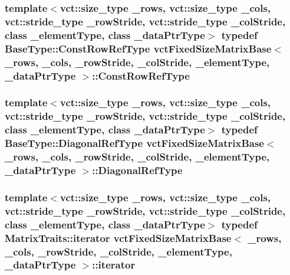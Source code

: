 \subsubsection[{Const\+Row\+Ref\+Type}]{\setlength{\rightskip}{0pt plus 5cm}template$<$vct\+::size\+\_\+type \+\_\+rows, vct\+::size\+\_\+type \+\_\+cols, vct\+::stride\+\_\+type \+\_\+row\+Stride, vct\+::stride\+\_\+type \+\_\+col\+Stride, class \+\_\+element\+Type, class \+\_\+data\+Ptr\+Type$>$ typedef {\bf Base\+Type\+::\+Const\+Row\+Ref\+Type} {\bf vct\+Fixed\+Size\+Matrix\+Base}$<$ \+\_\+rows, \+\_\+cols, \+\_\+row\+Stride, \+\_\+col\+Stride, \+\_\+element\+Type, \+\_\+data\+Ptr\+Type $>$\+::{\bf Const\+Row\+Ref\+Type}}\label{classvct_fixed_size_matrix_base_a506ec116d1e4c9c1b5d89f9f952e5b2d}
\hypertarget{classvct_fixed_size_matrix_base_af379c84a0eb55ebfac0c6bf715eb28e3}{}
\subsubsection[{Diagonal\+Ref\+Type}]{\setlength{\rightskip}{0pt plus 5cm}template$<$vct\+::size\+\_\+type \+\_\+rows, vct\+::size\+\_\+type \+\_\+cols, vct\+::stride\+\_\+type \+\_\+row\+Stride, vct\+::stride\+\_\+type \+\_\+col\+Stride, class \+\_\+element\+Type, class \+\_\+data\+Ptr\+Type$>$ typedef {\bf Base\+Type\+::\+Diagonal\+Ref\+Type} {\bf vct\+Fixed\+Size\+Matrix\+Base}$<$ \+\_\+rows, \+\_\+cols, \+\_\+row\+Stride, \+\_\+col\+Stride, \+\_\+element\+Type, \+\_\+data\+Ptr\+Type $>$\+::{\bf Diagonal\+Ref\+Type}}\label{classvct_fixed_size_matrix_base_af379c84a0eb55ebfac0c6bf715eb28e3}
\hypertarget{classvct_fixed_size_matrix_base_aeeeca0bc3fc21d2e48fd8e1ae2eaf836}{}
\subsubsection[{iterator}]{\setlength{\rightskip}{0pt plus 5cm}template$<$vct\+::size\+\_\+type \+\_\+rows, vct\+::size\+\_\+type \+\_\+cols, vct\+::stride\+\_\+type \+\_\+row\+Stride, vct\+::stride\+\_\+type \+\_\+col\+Stride, class \+\_\+element\+Type, class \+\_\+data\+Ptr\+Type$>$ typedef {\bf Matrix\+Traits\+::iterator} {\bf vct\+Fixed\+Size\+Matrix\+Base}$<$ \+\_\+rows, \+\_\+cols, \+\_\+row\+Stride, \+\_\+col\+Stride, \+\_\+element\+Type, \+\_\+data\+Ptr\+Type $>$\+::{\bf iterator}}\label{classvct_fixed_size_matrix_base_aeeeca0bc3fc21d2e48fd8e1ae2eaf836}
\hypertarget{classvct_fixed_size_matrix_base_a6691e8d4aab2e2d733c494357ffd870a}{}
